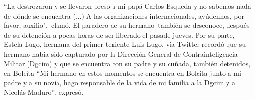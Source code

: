 \documentclass{article}%
\begin{document}
\newline%
%
“La destrozaron y se llevaron preso a mi papá Carlos Esqueda y no sabemos nada de dónde se encuentra (...) A las organizaciones internacionales, ayúdennos, por favor, auxilio",~clamó.%
\newline%
%
El paradero de su hermano~también se desconoce, después de su detención a pocas horas de ser liberado el pasado jueves.%
\newline%
%
Por su parte, Estela Lugo, hermana del primer teniente Luis Lugo, vía Twitter recordó que su hermano había sido capturado por la Dirección General de Contrainteligencia Militar (Dgcim) y que se encuentra con su padre y su cuñada, también detenidos, en Boleíta%
\newline%
%
“Mi hermano en  estos momentos se encuentra en Boleíta junto a mi padre y a su novia, hago responsable de la vida de mi familia a la Dgcim y a Nicolás Maduro”, expresó.%
\newline%
%
\end{document}

